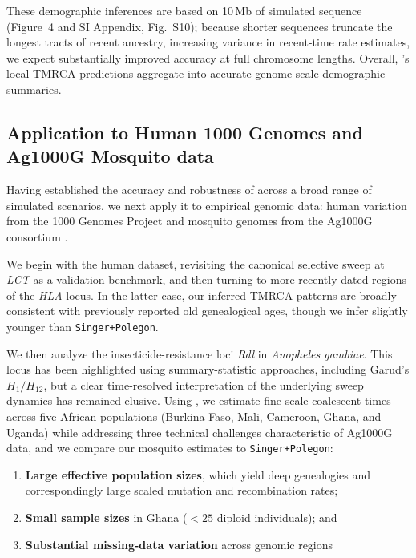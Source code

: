 \documentclass[9pt,twocolumn,twoside]{pnas-new}
\begin{document}
These demographic inferences are based on 10\,Mb of simulated sequence (Figure~4 and SI Appendix, Fig.~S10);
because shorter sequences truncate the longest tracts of recent ancestry, increasing variance in recent-time rate estimates,
we expect substantially improved accuracy at full chromosome lengths.
Overall, \cxtkit's local TMRCA predictions aggregate into accurate genome-scale demographic summaries.


\subsection*{Application to Human 1000 Genomes and Ag1000G Mosquito data}



Having established the accuracy and robustness of \cxtkit across a broad range of simulated scenarios, 
we next apply it to empirical genomic data: human variation from the 1000 Genomes Project \cite{10002010map} and mosquito genomes from the Ag1000G consortium \cite{anopheles2017genetic}.

We begin with the human dataset, 
revisiting the canonical selective sweep at \emph{LCT} as a validation benchmark,
and then turning to more recently dated regions of the \emph{HLA} locus.
In the latter case,
our inferred TMRCA patterns are broadly consistent with previously reported old genealogical ages,
though we infer slightly younger than \texttt{Singer+Polegon}. 

We then analyze the insecticide-resistance loci \emph{Rdl} in \textit{Anopheles gambiae}. 
This locus has been highlighted using summary-statistic approaches,
including Garud's $H_1/H_{12}$,
but a clear time-resolved interpretation of the underlying sweep dynamics has remained elusive. 
Using \cxtkit, we estimate fine-scale coalescent times across five African populations (Burkina Faso, Mali, Cameroon, Ghana, and Uganda) while addressing three technical challenges characteristic of Ag1000G data, and we compare our mosquito estimates to \texttt{Singer+Polegon}:

\begin{enumerate}
    \item \textbf{Large effective population sizes}, which yield deep genealogies and correspondingly large scaled mutation and recombination rates;
    \item \textbf{Small sample sizes} in Ghana (\(<25\) diploid individuals); and
    \item \textbf{Substantial missing-data variation} across genomic regions
\end{enumerate}
\end{document}
